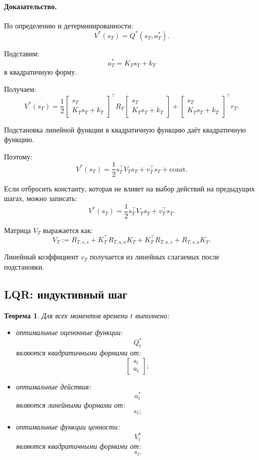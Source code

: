 \documentclass[12pt,a4paper]{article}
\newtheorem{theorem}{Теорема}
\begin{document}
\paragraph{Доказательство.}

По определению и детерминированности:
\[
V^\ast(s_T)
=
Q^\ast(s_T,a_T^\ast).
\]

Подставим:
\[
a_T^\ast
=
K_Ts_T+k_T
\]
в квадратичную форму.

Получаем:
\[
V^\ast(s_T)
=
\frac{1}{2}
\begin{bmatrix}
s_T\\
K_Ts_T+k_T
\end{bmatrix}^{\top}
R_T
\begin{bmatrix}
s_T\\
K_Ts_T+k_T
\end{bmatrix}
+
\begin{bmatrix}
s_T\\
K_Ts_T+k_T
\end{bmatrix}^{\top}
r_T.
\]

Подстановка линейной функции в квадратичную функцию даёт квадратичную функцию.

Поэтому:
\[
V^\ast(s_T)
=
\frac{1}{2}
s_T^\top V_Ts_T
+
v_T^\top s_T
+
\text{const}.
\]

Если отбросить константу, которая не влияет на выбор действий на предыдущих шагах, можно записать:
\[
V^\ast(s_T)
=
\frac{1}{2}
s_T^\top V_Ts_T
+
v_T^\top s_T.
\]

Матрица $V_T$ выражается как:
\[
V_T
:=
R_{T,s,s}
+
K_T^\top R_{T,a,a}K_T
+
K_T^\top R_{T,a,s}
+
R_{T,s,a}K_T.
\]

Линейный коэффициент $v_T$ получается из линейных слагаемых после подстановки.

\subsection{LQR: индуктивный шаг}

\begin{theorem}
Для всех моментов времени $t$ выполнено:
\begin{itemize}
    \item оптимальные оценочные функции:
    \[
    Q_t^\ast
    \]
    являются квадратичными формами от:
    \[
    \begin{bmatrix}
    s_t\\
    a_t
    \end{bmatrix};
    \]

    \item оптимальные действия:
    \[
    a_t^\ast
    \]
    являются линейными формами от:
    \[
    s_t;
    \]

    \item оптимальные функции ценности:
    \[
    V_t^\ast
    \]
    являются квадратичными формами от:
    \[
    s_t.
    \]
\end{itemize}
\end{theorem}
\end{document}

